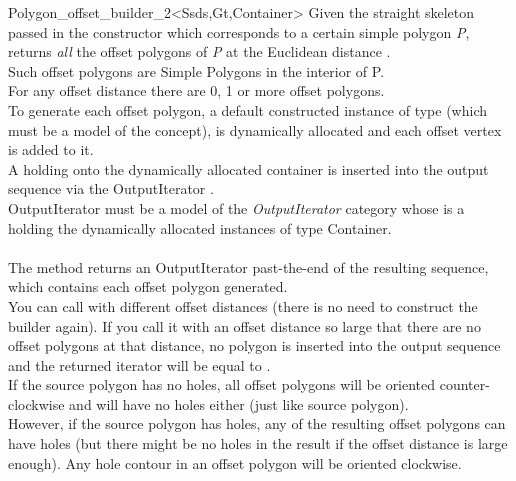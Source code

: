 \begin{ccRefClass}{Polygon_offset_builder_2<Ssds,Gt,Container>}
{Given the straight skeleton passed in the constructor which corresponds to a certain simple polygon \textit{P}, returns \textit{all} the offset polygons of \textit{P} at the Euclidean distance .\\
Such offset polygons are Simple Polygons in the interior of P.\\
For any offset distance  there are 0, 1 or more offset polygons.\\
To generate each offset polygon, a default constructed instance of  type (which must be a model of the  concept), is dynamically allocated and each offset vertex is added to it.\\
A  holding onto the dynamically allocated container is inserted into the output sequence via the OutputIterator .\\
OutputIterator must be a model of the \textit{OutputIterator} category whose  is a  holding the dynamically allocated instances of type Container.\\\\
The method returns an OutputIterator past-the-end of the resulting sequence, which contains each offset polygon generated.\\
You can call  with different offset distances (there is no need to construct the builder  again). If you call it with an offset distance so large that there are no offset polygons at that distance, no polygon is inserted into the output sequence and the returned iterator will be equal to .\\
If the source polygon has no holes, all offset polygons will be oriented counter-clockwise and will have no holes either (just like source polygon).\\
However, if the source polygon has holes, any of the resulting offset polygons can have holes (but there might be no holes in the result if the offset distance is large enough). Any hole contour in an offset polygon will be oriented clockwise.}
   

\ccSeeAlso
{}\\
\\
\\
\end{ccRefClass}


